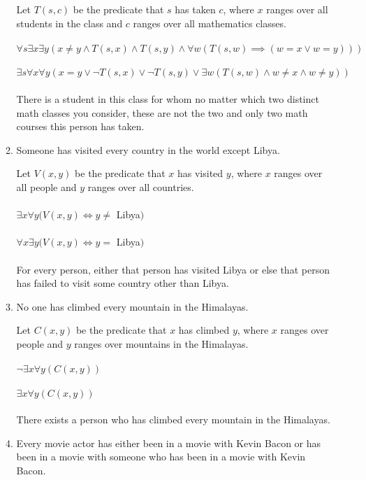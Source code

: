 \documentclass[11pt]{article}
\begin{document}
\begin{enumerate}[label=\textbf{\arabic*.}]
\begin{enumerate}[label=\textbf{\alph*)}]
		Let $T(s, c)$ be the predicate that $s$ has taken $c$, where $x$ ranges over all students in the class and $c$ ranges over all mathematics classes. \\
		\\
		$\forall s\exists x\exists y(x \ne y \land T(s, x) \land T(s, y) \land \forall w(T(s, w) \implies (w = x \lor w = y)))$ \\
		\\
		$\exists s\forall x\forall y(x = y \lor \neg T(s, x) \lor \neg T(s, y) \lor \exists w(T(s, w) \land w \ne x \land w \ne y))$ \\
		\\
		There is a student in this class for whom no matter which two distinct math classes you consider, these are not the two and only two math courses this person has taken.
		
		\item Someone has visited every country in the world except Libya.
		
		Let $V(x, y)$ be the predicate that $x$ has visited $y$, where $x$ ranges over all people and $y$ ranges over all countries. \\
		\\
		$\exists x\forall y(V(x, y) \iff y \ne$ Libya$)$ \\
		\\
		$\forall x\exists y(V(x, y) \iff y =$ Libya$)$ \\
		\\
		For every person, either that person has visited Libya or else that person has failed to visit some country other than Libya.
		
		\item No one has climbed every mountain in the Himalayas.
		
		Let $C(x, y)$ be the predicate that $x$ has climbed $y$, where $x$ ranges over people and $y$ ranges over mountains in the Himalayas. \\
		\\
		$\neg\exists x\forall y(C(x, y))$ \\
		\\
		$\exists x\forall y(C(x, y))$ \\
		\\
		There exists a person who has climbed every mountain in the Himalayas.
		
		\item Every movie actor has either been in a movie with Kevin Bacon or has been in a movie with someone who has been in a movie with Kevin Bacon.
		

\end{enumerate}
\end{enumerate}
\end{document}
